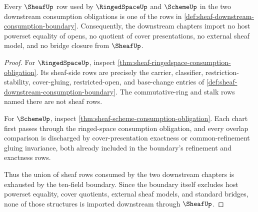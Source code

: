 \begin{theorem}
\label{thm:sheaf-downstream-consumption-exhaustion}
Every $\SheafUp$ row used by $\RingedSpaceUp$ and $\SchemeUp$ in the two downstream consumption obligations is one of the rows in \autoref{def:sheaf-downstream-consumption-boundary}. Consequently, the downstream chapters import no host powerset equality of opens, no quotient of cover presentations, no external sheaf model, and no bridge closure from $\SheafUp$.
\end{theorem}
\begin{proof}
For $\RingedSpaceUp$, inspect \autoref{thm:sheaf-ringedspace-consumption-obligation}. Its sheaf-side rows are precisely the carrier, classifier, restriction-stability, cover-gluing, restricted-open, and base-change entries of \autoref{def:sheaf-downstream-consumption-boundary}. The commutative-ring and stalk rows named there are not sheaf rows.

For $\SchemeUp$, inspect \autoref{thm:sheaf-scheme-consumption-obligation}. Each chart first passes through the ringed-space consumption obligation, and every overlap comparison is discharged by cover-presentation exactness or common-refinement gluing invariance, both already included in the boundary's refinement and exactness rows.

Thus the union of sheaf rows consumed by the two downstream chapters is exhausted by the ten-field boundary. Since the boundary itself excludes host powerset equality, cover quotients, external sheaf models, and standard bridges, none of those structures is imported downstream through $\SheafUp$.
\end{proof}
